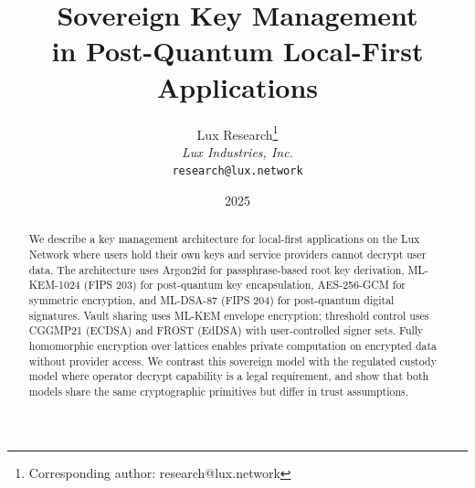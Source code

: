 \documentclass[11pt,a4paper]{article}
\title{\textbf{Sovereign Key Management\\in Post-Quantum Local-First Applications}}
\author{
Lux Research\thanks{Corresponding author: research@lux.network} \\[6pt]
\textit{Lux Industries, Inc.} \\
\texttt{research@lux.network}
}
\date{2025}
\begin{document}
\luxcoverpage

\begin{abstract}
We describe a key management architecture for local-first applications on
the Lux Network where users hold their own keys and service providers
cannot decrypt user data.  The architecture uses Argon2id for passphrase-based
root key derivation, ML-KEM-1024 (FIPS 203) for post-quantum key encapsulation,
AES-256-GCM for symmetric encryption, and ML-DSA-87 (FIPS 204) for
post-quantum digital signatures.  Vault sharing uses ML-KEM envelope
encryption; threshold control uses CGGMP21 (ECDSA) and FROST (EdDSA)
with user-controlled signer sets.  Fully homomorphic encryption over
lattices enables private computation on encrypted data without provider
access.  We contrast this sovereign model with the regulated custody model
where operator decrypt capability is a legal requirement, and show that
both models share the same cryptographic primitives but differ in trust
assumptions.
\end{abstract}

\tableofcontents
\newpage









\end{document}
